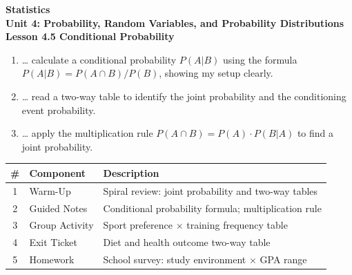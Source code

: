 \documentclass[10pt]{article}
\begin{document}
\vspace{-0.8in}

\begin{center}
  {\color{white}\textbf{\LARGE Statistics}}\\[4pt]
  {\color{skymid}\large\textbf{Unit 4: Probability, Random Variables, and Probability Distributions}}\\[6pt]
  {\color{white}\textbf{\large Lesson 4.5 \quad Conditional Probability}}
\end{center}

\vspace{0.22in}
\namedateperiod
\vspace{0.18in}

\begin{learningtargetbox}
\small
\begin{enumerate}[leftmargin=1.5em, itemsep=5pt]
  \item \ldots{} calculate a conditional probability $P(A|B)$ using the formula
        $P(A|B) = P(A \cap B)/P(B)$, showing my setup clearly.
  \item \ldots{} read a two-way table to identify the joint probability and the
        conditioning event probability.
  \item \ldots{} apply the multiplication rule $P(A \cap B) = P(A) \cdot P(B|A)$
        to find a joint probability.
\end{enumerate}
\end{learningtargetbox}

\vspace{0.14in}

\begin{tocbox}
\small
\renewcommand{\arraystretch}{1.5}
\begin{tabularx}{\linewidth}{@{} c l X @{}}
\rowcolor{sky}
\textbf{\#} & \textbf{Component} & \textbf{Description} \\
\midrule
1 & Warm-Up        & Spiral review: joint probability and two-way tables \\
2 & Guided Notes   & Conditional probability formula; multiplication rule \\
3 & Group Activity & Sport preference $\times$ training frequency table \\
4 & Exit Ticket    & Diet and health outcome two-way table \\
5 & Homework       & School survey: study environment $\times$ GPA range \\
\end{tabularx}
\end{tocbox}
\end{document}
